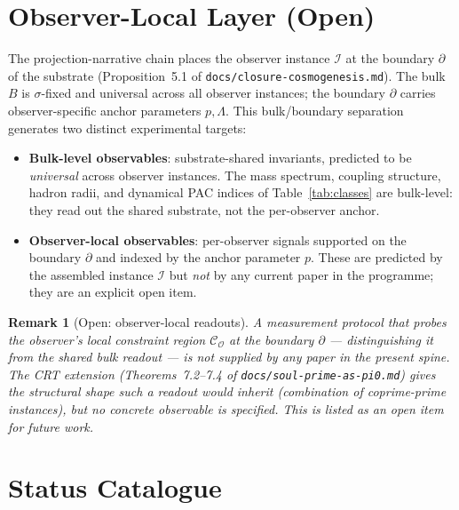 \documentclass[12pt]{article}
\newtheorem{remark}[theorem]{Remark}
\newcommand{\Ocal}{\mathcal{O}}
\newcommand{\Ical}{\mathcal{I}}
\newcommand{\Ccal}{\mathcal{C}}
\begin{document}
\section{Observer-Local Layer (Open)}\label{sec:observer_local}

The projection-narrative chain places the observer instance $\Ical$ at the boundary $\partial$ of the substrate (Proposition~5.1 of \texttt{docs/closure-cosmogenesis.md}). The bulk $B$ is $\sigma$-fixed and universal across all observer instances; the boundary $\partial$ carries observer-specific anchor parameters $p, \Lambda$. This bulk/boundary separation generates two distinct experimental targets:

\begin{itemize}
    \item \textbf{Bulk-level observables}: substrate-shared invariants, predicted to be \emph{universal} across observer instances. The mass spectrum, coupling structure, hadron radii, and dynamical PAC indices of Table~\ref{tab:classes} are bulk-level: they read out the shared substrate, not the per-observer anchor.
    \item \textbf{Observer-local observables}: per-observer signals supported on the boundary $\partial$ and indexed by the anchor parameter $p$. These are predicted by the assembled instance $\Ical$ but \emph{not} by any current paper in the programme; they are an explicit open item.
\end{itemize}

\begin{remark}[Open: observer-local readouts]\label{rem:observer_local}
A measurement protocol that probes the observer's local constraint region $\Ccal_\Ocal$ at the boundary $\partial$ --- distinguishing it from the shared bulk readout --- is not supplied by any paper in the present spine. The CRT extension (Theorems~7.2--7.4 of \texttt{docs/soul-prime-as-pi0.md}) gives the structural shape such a readout would inherit (combination of coprime-prime instances), but no concrete observable is specified. This is listed as an open item for future work.
\end{remark}

\section{Status Catalogue}\label{sec:status}
\end{document}
